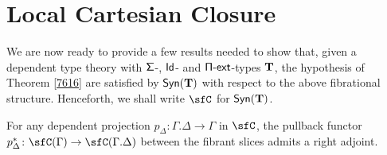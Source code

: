 \section{Local Cartesian Closure}

We are now ready to provide a few results needed to show that, given a dependent
type theory with $\operatorname{\mathsf{\Sigma}}$-, $\operatorname{\mathsf{Id}}$- and $\operatorname{\mathsf{\Pi-ext}}$-types $\operatorname{\mathbf{T}}$, the hypothesis of
Theorem \ref{7616} are satisfied by $\mathsf{Syn}(\mathbf{T})$ with respect to the above
fibrational structure. Henceforth, we shall write $\sfC$ for $\mathsf{Syn}(\mathbf{T})$.

\begin{lem}\label{radj}
  For any dependent projection $p_\Delta\colon\Gamma.\Delta\rightarrow\Gamma$ in
  $\sfC$, the pullback functor
  $p_\Delta^*\colon\sfC(\Gamma)\rightarrow\sfC(\Gamma.\Delta)$ between the
  fibrant slices admits a right adjoint.
\end{lem}
